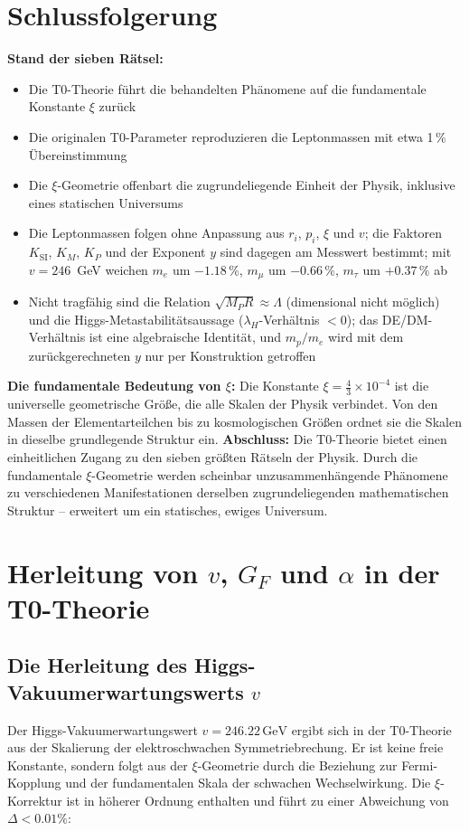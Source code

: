 	\section{Schlussfolgerung}
	\textbf{Stand der sieben Rätsel:}
	\begin{itemize}
		\item Die T0-Theorie führt die behandelten Phänomene auf die fundamentale Konstante $\xi$ zurück
		\item Die originalen T0-Parameter reproduzieren die Leptonmassen mit etwa 1\,\% Übereinstimmung
		\item Die $\xi$-Geometrie offenbart die zugrundeliegende Einheit der Physik, inklusive eines statischen Universums
		\item Die Leptonmassen folgen ohne Anpassung aus $r_i$, $p_i$, $\xi$ und $v$; die Faktoren $K_{\text{SI}}$, $K_M$, $K_P$ und der Exponent $y$ sind dagegen am Messwert bestimmt; mit $v = 246$~GeV weichen $m_e$ um $-1.18\,\%$, $m_\mu$ um $-0.66\,\%$, $m_\tau$ um $+0.37\,\%$ ab
		\item Nicht tragfähig sind die Relation $\sqrt{M_P R} \approx \Lambda$ (dimensional nicht möglich) und die Higgs-Metastabilitätsaussage ($\lambda_H$-Verhältnis $< 0$); das DE/DM-Verhältnis ist eine algebraische Identität, und $m_p/m_e$ wird mit dem zurückgerechneten $y$ nur per Konstruktion getroffen
	\end{itemize}
	\textbf{Die fundamentale Bedeutung von $\xi$:}
	Die Konstante $\xi = \frac{4}{3} \times 10^{-4}$ ist die universelle geometrische Größe, die alle Skalen der Physik verbindet. Von den Massen der Elementarteilchen bis zu kosmologischen Größen ordnet sie die Skalen in dieselbe grundlegende Struktur ein.
	\vspace{1cm}
	\noindent\textbf{Abschluss:} Die T0-Theorie bietet einen einheitlichen Zugang zu den sieben größten Rätseln der Physik. Durch die fundamentale $\xi$-Geometrie werden scheinbar unzusammenhängende Phänomene zu verschiedenen Manifestationen derselben zugrundeliegenden mathematischen Struktur – erweitert um ein statisches, ewiges Universum.
	\appendix
	\section{Herleitung von $v$, $G_F$ und $\alpha$ in der T0-Theorie}
	\subsection{Die Herleitung des Higgs-Vakuumerwartungswerts $v$}
	Der Higgs-Vakuumerwartungswert $v = 246.22\,\si{\giga\electronvolt}$ ergibt sich in der T0-Theorie aus der Skalierung der elektroschwachen Symmetriebrechung. Er ist keine freie Konstante, sondern folgt aus der $\xi$-Geometrie durch die Beziehung zur Fermi-Kopplung und der fundamentalen Skala der schwachen Wechselwirkung. Die $\xi$-Korrektur ist in höherer Ordnung enthalten und führt zu einer Abweichung von $\Delta < 0.01\%$:
	
